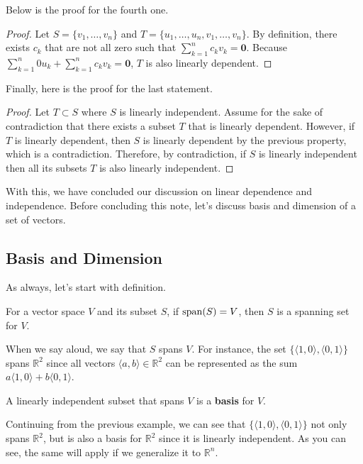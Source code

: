 \documentclass[../main.tex]{subfiles}
\begin{document}
Below is the proof for the fourth one.

\begin{proof}
Let $S = \{ v_1, \ldots, v_n \}$ and $T = \{ u_1, \ldots, u_n,
v_1, \ldots, v_n \}$. By definition, there exists $c_k$ that are
not all zero such that $\sum_{k = 1}^n c_k v_k = \mathbf{0}$.
Because $\sum_{k = 1}^n 0 u_k + \sum_{k = 1}^n c_k v_k = \mathbf{0}$,
$T$ is also linearly dependent.
\end{proof}

Finally, here is the proof for the last statement.

\begin{proof}
Let $T \subset S$ where $S$ is linearly independent. Assume for
the sake of contradiction that there exists a subset $T$ that is
linearly dependent. However, if $T$ is linearly dependent, then
$S$ is linearly dependent by the previous property, which is
a contradiction. Therefore, by contradiction, if $S$ is linearly
independent then all its subsets $T$ is also linearly independent.
\end{proof}

With this, we have concluded our discussion on linear dependence
and independence. Before concluding this note, let's discuss
basis and dimension of a set of vectors.

\subsection{Basis and Dimension}

As always, let's start with definition.

\begin{definition}
For a vector space $V$ and its subset $S$, if $\operatorname{span}(S) = V$, then
$S$ is a spanning set for $V$.
\end{definition}

When we say aloud, we say that $S$ spans $V$. For instance, the set
$\{ \langle 1, 0 \rangle, \langle 0, 1 \rangle \}$ spans
$\mathbb{R}^2$ since all vectors $\langle a, b \rangle \in
\mathbb{R}^2$ can be represented as the sum $a \langle 1, 0 \rangle
+ b\langle 0, 1 \rangle$.

\begin{definition}
A linearly independent subset that spans $V$ is a \textbf{basis} for
$V$.
\end{definition}

Continuing from the previous example, we can see that $\{ \langle 1, 0
\rangle, \langle 0, 1 \rangle \}$ not only spans $\mathbb{R}^2$,
but is also a basis for $\mathbb{R}^2$ since it is linearly
independent. As you can see, the same will apply if we generalize it
to $\mathbb{R}^n$.
\end{document}
